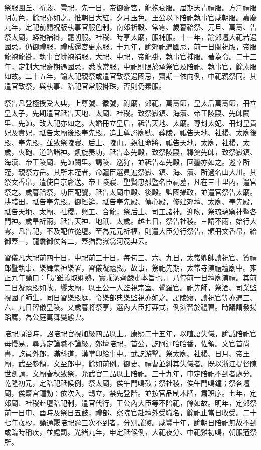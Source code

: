 \begin{pinyinscope}
祭服圜丘、祈穀、雩祀，先一日，帝御齋宮，龍袍袞服。屆期天青禮服。方澤禮服明黃色，餘祀亦如之。惟朝日大紅，夕月玉色。王公以下陪祀執事官咸朝服。嘉慶九年，定祀前閱祝版執事官服色制，南郊祈穀、常雩、歲暮祫祭、元旦、萬壽、告祭太廟，蟒袍補褂，罷朝服。社稷、時享太廟，服補服。十一年，諭郊壇大祀若遇國忌，仍御禮服，禮成還宮更素服。十九年，諭郊祀遇國忌，前一日閱祝版，帝服龍袍龍褂，執事官蟒袍補服。大祀、中祀，帝龍褂，執事官補服。著為令。二十三年，定制大祀齋期遇國忌，悉改常服。中祀則限於承祭官及陪祀、執事官，餘素服如故。二十五年，諭大祀親祭或遣官致祭遇國忌，齋期一依向例，中祀親祭同。其遣官致祭，與執事、陪祀官常服掛珠，否則仍素服。

祭告凡登極授受大典，上尊號、徽號，祔廟，郊祀，萬壽節，皇太后萬壽節，冊立皇太子，先期遣官祗告天地、太廟、社稷。致祭嶽鎮、海瀆、帝王陵寢、先師闕里、先師。改大祀亦如之。大婚冊立皇后，祗告天地、太廟。尊封太妃、冊封皇貴妃及貴妃，祗告太廟後殿奉先殿。追上尊謚廟號、葬陵，祗告天地、社稷、太廟後殿、奉先殿，並致祭陵寢、后土、陵山。親征命將，祗告天地，太廟，社稷，太歲，火砲、道路諸神。凱旋奏功，祗告奉先殿，致祭陵寢，釋奠先師，致祭嶽鎮、海瀆、帝王陵廟、先師闕里。謁陵、巡狩，並祗告奉先殿，回鑾亦如之。巡幸所蒞，親祭方岳。其所未蒞者，命疆臣選員遍祭嶽、鎮、海、瀆、所過名山大川。其祭文香帛，遣使自京齎送。帝王陵寢、聖賢忠烈暨名臣祠墓，凡在三十里內，遣官祭之。歲暮祫祭，功臣配饗，祗告太廟中殿、後殿。監國攝政，並遣官祭告太廟。耕耤田，祗告奉先殿。御經筵，祗告奉先殿、傳心殿，修建郊壇、太廟、奉先殿，祗告天地、太廟、社稷。興工、合龍，祭后土、司工諸神。迎吻，祭琉璃窯神暨各門神。歲旱祈雨，祗告天神、地祇、太歲。越七日，祭告社稷。三請不雨，始行大雩。凡告祀，不及配位從壇。至為元元祈福，則遣大臣分行祭告，頒冊文香帛，給御蓋一，龍纛御仗各二，蓋猶喬嶽翕河茂典云。

習儀凡大祀前四十日，中祀前三十日，每旬三、六、九日，太常卿帥讀祝官、贊禮郎暨執事、樂舞集神樂署，習儀凝禧殿。故事，祭祀先期，太常寺演禮壇廟中。雍正九年諭曰：「是雖義取嫻熟，實乖潔齊嚴肅本旨也。」乃停前一日壇廟演禮。其前二日凝禧殿如故。饗太廟，以王公一人監視宗室、覺羅官。祀先師，祭酒、司業監視國子師生，同日習樂殿庭，令樂部典樂監視亦如之。謁陵寢，讀祝官等亦遇三、六、九日習儀皇陵。又歲暮將祭享，選內大臣打莽式，例演習於禮曹。時議謂發揚蹈厲，為公庭萬舞變態雲。

陪祀順治時，詔陪祀官視加級四品以上。康熙二十五年，以喧語失儀，諭誡陪祀官毋慢易。尋議定論職不論級。郊壇陪祀，首公，訖阿達哈哈番，佐領。文官首尚書，訖員外郎，滿科道，漢掌印給事中。武訖游擊。祭太廟、社稷、日月、帝王廟，武至參領，文至郎中，餘如前例。御史、禮曹並糾其失儀者。既以浙江提督陳世凱請，文廟春秋致祭，允武官二品以上陪祀。三十九年，申定陪祀不到者處分。乾隆初元，定陪祀祗候例，祭太廟，俟午門鳴鼓；祭社稷，俟午門鳴鐘；祭各壇廟，俟齋宮鐘動：依次入，鵠立，禁先登階。並按官品制木牌，肅班序。七年，定郊廟、社稷赴壇陪祀制，遣官代行，王公內大臣等不陪祀，餘如故。明年，定郊祭前一日申、酉時及祭日五鼓，禮部、察院官赴壇外受職名，餘祀止當日收受。二十七年歲杪，諭通覈陪祀逾三次不到者，分別議懲。咸豐十年，諭朝日陪祀無故不到或臨時稱疾，並處罰。光緒九年，申定祗候例，大祀夜分、中祀雞初鳴，朝服蒞祭所。


\end{pinyinscope}